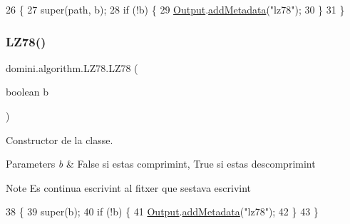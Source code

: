 \begin{DoxyCode}
26                                         \{
27         super(path, b);
28         \textcolor{keywordflow}{if} (!b) \{
29             \hyperlink{classdomini_1_1algorithm_1_1Algorithm_a4de9955411c656325adc391ef570c082}{Output}.\hyperlink{classpersistencia_1_1output_1_1Ctrl__Output_ae6d6857910a023982900ddc857b891f0}{addMetadata}(\textcolor{stringliteral}{"lz78"});
30         \}
31     \}
\end{DoxyCode}
\mbox{\label{classdomini_1_1algorithm_1_1LZ78_abdeba774404b53d266e9fbe4aa35f757}} 
\subsubsection{\texorpdfstring{L\+Z78()}{LZ78()}\hspace{0.1cm}{\footnotesize\ttfamily [2/2]}}
{\footnotesize\ttfamily domini.\+algorithm.\+L\+Z78.\+L\+Z78 (\begin{DoxyParamCaption}\item[{boolean}]{b }\end{DoxyParamCaption})\hspace{0.3cm}{\ttfamily [inline]}}



Constructor de la classe. 


\begin{DoxyParams}{Parameters}
{\em b} & False si estas comprimint, True si estas descomprimint \\
\hline
\end{DoxyParams}
\begin{DoxyNote}{Note}
Es continua escrivint al fitxer que s\textquotesingle{}estava escrivint 
\end{DoxyNote}

\begin{DoxyCode}
38                            \{
39         super(b);
40         \textcolor{keywordflow}{if} (!b) \{
41             \hyperlink{classdomini_1_1algorithm_1_1Algorithm_a4de9955411c656325adc391ef570c082}{Output}.\hyperlink{classpersistencia_1_1output_1_1Ctrl__Output_ae6d6857910a023982900ddc857b891f0}{addMetadata}(\textcolor{stringliteral}{"lz78"});
42         \}
43     \}
\end{DoxyCode}


